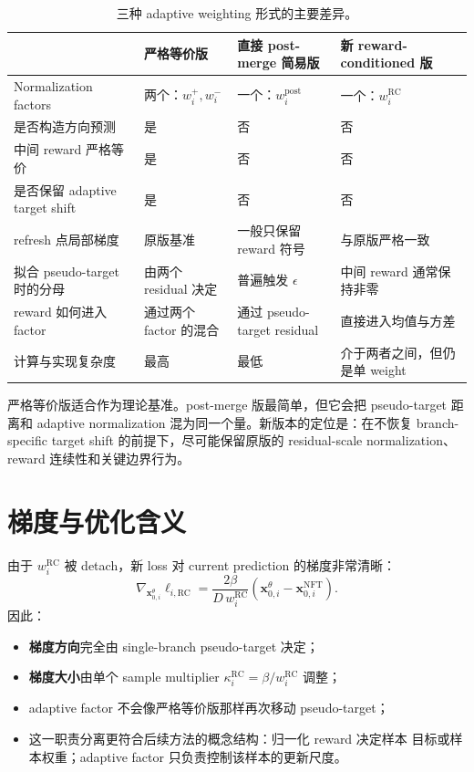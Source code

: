 \documentclass[11pt,a4paper]{article}
\newcommand{\xcur}{\mathbf{x}_{0,i}^{\theta}}
\newcommand{\xtarget}{\mathbf{x}_{0,i}^{\mathrm{NFT}}}
\newcommand{\eps}{\epsilon}
\newcommand{\R}{\mathrm{RC}}
\begin{document}
\begin{table}[ht]
\centering
\footnotesize
\caption{三种 adaptive weighting 形式的主要差异。}
\begin{tabularx}{\textwidth}{@{}p{}YYY@{}}
\toprule
 & 严格等价版 & 直接 post-merge 简易版 & 新 reward-conditioned 版\\
\midrule
Normalization factors
& 两个：$w_i^+,w_i^-$
& 一个：$w_i^{\mathrm{post}}$
& 一个：$w_i^{\R}$\\
\addlinespace
是否构造方向预测
& 是
& 否
& 否\\
\addlinespace
中间 reward 严格等价
& 是
& 否
& 否\\
\addlinespace
是否保留 adaptive target shift
& 是
& 否
& 否\\
\addlinespace
refresh 点局部梯度
& 原版基准
& 一般只保留 reward 符号
& 与原版严格一致\\
\addlinespace
拟合 pseudo-target 时的分母
& 由两个 residual 决定
& 普遍触发 $\eps$
& 中间 reward 通常保持非零\\
\addlinespace
reward 如何进入 factor
& 通过两个 factor 的混合
& 通过 pseudo-target residual
& 直接进入均值与方差\\
\addlinespace
计算与实现复杂度
& 最高
& 最低
& 介于两者之间，但仍是单 weight\\
\bottomrule
\end{tabularx}
\end{table}

严格等价版适合作为理论基准。post-merge 版最简单，但它会把 pseudo-target
距离和 adaptive normalization 混为同一个量。新版本的定位是：在不恢复
branch-specific target shift 的前提下，尽可能保留原版的 residual-scale
normalization、reward 连续性和关键边界行为。

\section{梯度与优化含义}

由于 $w_i^{\R}$ 被 detach，新 loss 对 current prediction 的梯度非常清晰：
\begin{equation}
\nabla_{\xcur}\ell_{i,\R}
=
\frac{2\beta}{D\,w_i^{\R}}
\left(
\xcur-\xtarget
\right).
\label{eq:new-gradient}
\end{equation}
因此：
\begin{itemize}
  \item \textbf{梯度方向}完全由 single-branch pseudo-target 决定；
  \item \textbf{梯度大小}由单个 sample multiplier
  $\kappa_i^{\R}=\beta/w_i^{\R}$ 调整；
  \item adaptive factor 不会像严格等价版那样再次移动 pseudo-target；
  \item 这一职责分离更符合后续方法的概念结构：归一化 reward 决定样本
  目标或样本权重；adaptive factor 只负责控制该样本的更新尺度。
\end{itemize}
\end{document}

